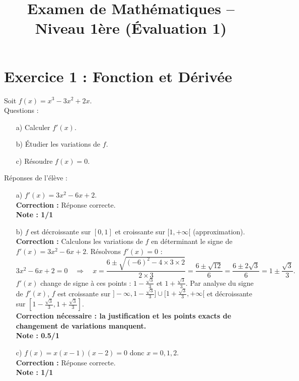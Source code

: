 \documentclass{article}
\begin{document}
\title{Examen de Mathématiques – Niveau 1ère (Évaluation 1)}
\maketitle

\section*{Exercice 1 : Fonction et Dérivée}
Soit $f(x) = x^3 - 3x^2 + 2x$. \\
Questions :
\begin{enumerate}
    \item[a)] Calculer $f'(x)$.
    \item[b)] Étudier les variations de $f$.
    \item[c)] Résoudre $f(x) = 0$.
\end{enumerate}
Réponses de l’élève :
\begin{enumerate}
    \item[a)] $f'(x) = 3x^2 - 6x + 2$. \\
    \textbf{Correction :} Réponse correcte.\\
    \textbf{Note : 1/1}
    
    \item[b)] $f$ est décroissante sur $[0,1]$ et croissante sur $[1,+\infty[$ (approximation). \\
    \textbf{Correction :} Calculons les variations de $f$ en déterminant le signe de $f'(x) = 3x^2 - 6x + 2$. Résolvons $f'(x) = 0$ :
    \[
    3x^2 - 6x + 2 = 0 \quad \Rightarrow \quad x = \frac{6 \pm \sqrt{(-6)^2 - 4 \times 3 \times 2}}{2 \times 3} = \frac{6 \pm \sqrt{12}}{6} = \frac{6 \pm 2\sqrt{3}}{6} = 1 \pm \frac{\sqrt{3}}{3}.
    \]
    $f'(x)$ change de signe à ces points : $1 - \frac{\sqrt{3}}{3}$ et $1 + \frac{\sqrt{3}}{3}$. Par analyse du signe de $f'(x)$, $f$ est croissante sur $]-\infty, 1 - \frac{\sqrt{3}}{3}] \cup [1 + \frac{\sqrt{3}}{3}, +\infty[$ et décroissante sur $[1 - \frac{\sqrt{3}}{3}, 1 + \frac{\sqrt{3}}{3}]$.\\
    \textbf{Correction nécessaire : la justification et les points exacts de changement de variations manquent.} \\
    \textbf{Note : 0.5/1}
    
    \item[c)] $f(x) = x(x-1)(x-2) = 0$ donc $x = 0, 1, 2$. \\
    \textbf{Correction :} Réponse correcte.\\
    \textbf{Note : 1/1}
\end{enumerate}
\end{document}
